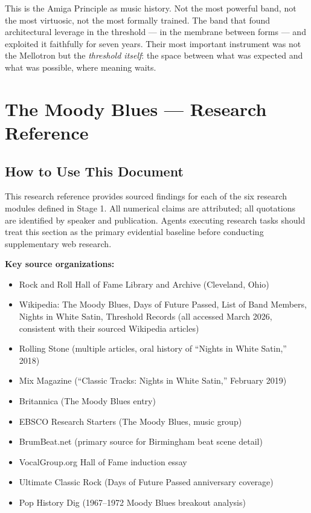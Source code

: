 \documentclass[11pt,letterpaper]{article}
\newcommand{\stageheader}[2]{%
  \noindent\colorbox{#2}{\makebox[\textwidth][l]{%
    \textcolor{white}{\bfseries\sffamily\hspace{6pt}#1\hspace{6pt}}}}%
  \vspace{0.5em}\par%
}
\begin{document}
This is the Amiga Principle as music history. Not the most powerful band, not the most virtuosic, not the most formally trained. The band that found architectural leverage in the threshold --- in the membrane between forms --- and exploited it faithfully for seven years. Their most important instrument was not the Mellotron but the \textit{threshold itself}: the space between what was expected and what was possible, where meaning waits.

\newpage

\stageheader{STAGE 2 --- RESEARCH REFERENCE}{secondary}

\section{The Moody Blues --- Research Reference}

\subsection{How to Use This Document}

This research reference provides sourced findings for each of the six research modules defined in Stage 1. All numerical claims are attributed; all quotations are identified by speaker and publication. Agents executing research tasks should treat this section as the primary evidential baseline before conducting supplementary web research.

\textbf{Key source organizations:}
\begin{itemize}[leftmargin=*]
  \item Rock and Roll Hall of Fame Library and Archive (Cleveland, Ohio)
  \item Wikipedia: The Moody Blues, Days of Future Passed, List of Band Members, Nights in White Satin, Threshold Records (all accessed March 2026, consistent with their sourced Wikipedia articles)
  \item Rolling Stone (multiple articles, oral history of ``Nights in White Satin,'' 2018)
  \item Mix Magazine (``Classic Tracks: Nights in White Satin,'' February 2019)
  \item Britannica (The Moody Blues entry)
  \item EBSCO Research Starters (The Moody Blues, music group)
  \item BrumBeat.net (primary source for Birmingham beat scene detail)
  \item VocalGroup.org Hall of Fame induction essay
  \item Ultimate Classic Rock (Days of Future Passed anniversary coverage)
  \item Pop History Dig (1967--1972 Moody Blues breakout analysis)
\end{itemize}
\end{document}
